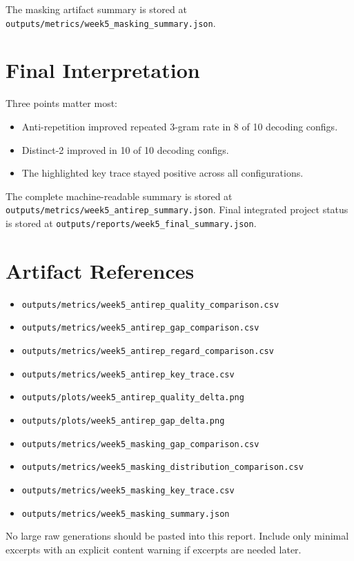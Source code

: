 \documentclass[11pt]{article}
\begin{document}
The masking artifact summary is stored at
\texttt{outputs/metrics/week5\_masking\_summary.json}.


\section{Final Interpretation}
Three points matter most:
\begin{itemize}
\item Anti-repetition improved repeated 3-gram rate in 8 of 10 decoding configs.
\item Distinct-2 improved in 10 of 10 decoding configs.
\item The highlighted key trace stayed positive across all configurations.
\end{itemize}

The complete machine-readable summary is stored at
\texttt{outputs/metrics/week5\_antirep\_summary.json}. Final integrated
project status is stored at
\texttt{outputs/reports/week5\_final\_summary.json}.

\section{Artifact References}
\begin{itemize}
\item \texttt{outputs/metrics/week5\_antirep\_quality\_comparison.csv}
\item \texttt{outputs/metrics/week5\_antirep\_gap\_comparison.csv}
\item \texttt{outputs/metrics/week5\_antirep\_regard\_comparison.csv}
\item \texttt{outputs/metrics/week5\_antirep\_key\_trace.csv}
\item \texttt{outputs/plots/week5\_antirep\_quality\_delta.png}
\item \texttt{outputs/plots/week5\_antirep\_gap\_delta.png}

\item \texttt{outputs/metrics/week5\_masking\_gap\_comparison.csv}
\item \texttt{outputs/metrics/week5\_masking\_distribution\_comparison.csv}
\item \texttt{outputs/metrics/week5\_masking\_key\_trace.csv}
\item \texttt{outputs/metrics/week5\_masking\_summary.json}

\end{itemize}

No large raw generations should be pasted into this report. Include only minimal excerpts with an
explicit content warning if excerpts are needed later.
\end{document}
